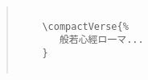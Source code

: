 \documentclass[letterpaper]{article}
\begin{document}
\pagebreak

\vspace*{2cm}

\renewcommand{\kanji}{\centering\fontsize{25}{25}}
\begin{multicols}{7}
	\RLmulticolcolumns
\end{multicols}

\vspace*{1cm}

\begin{quotation}
	
	\begin{verbatim}
	
	\compactVerse{%
	   般若心經ロ一マ... 
	}
	
	\end{verbatim}
	
\end{quotation}

\shoutout
\end{document}
